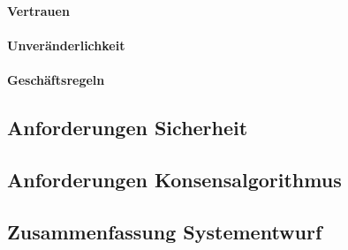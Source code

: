 \paragraph{Vertrauen}

\paragraph{Unveränderlichkeit}

\paragraph{Geschäftsregeln}

\subsection{Anforderungen Sicherheit}

\subsection{Anforderungen Konsensalgorithmus}

\subsection{Zusammenfassung Systementwurf}

\newpage
